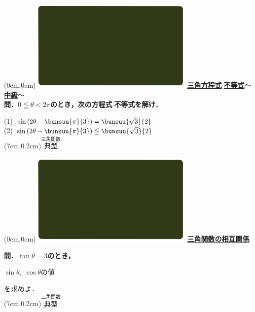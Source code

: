 \documentclass[10pt,
fleqn,
dvipdfmx,
uplatex
]{jsarticle}
\begin{document}
\newpage

\at(0cm,0cm){\includegraphics[width=8cm,bb=0 0 1920 1080]{./youtube/thumbnails/templates/smart_background/三角関数.jpeg}}
{\color{orange}\bf\boldmath\Large\underline{三角方程式$\cdot$不等式$〜$中級$〜$}}\vspace{0.3zw}\\
\small 
\bf\boldmath 問．$0\leqq \theta <2\pi$のとき，次の方程式$\cdot$不等式を解け．\vspace{0.5zw}

\Large 
(1)  $\sin \left(2\theta -\bunsuu{\pi }{3}\right)=\bunsuu{{\sqrt 3}}{2}$\\
(2)  $\sin \left(2\theta -\bunsuu{\pi }{3}\right)\leqq \bunsuu{{\sqrt 3}}{2}$\\

\at(7cm,0.2cm){\small\color{bradorange}$\overset{\text{三角関数}}{\text{典型}}$}

\newpage

\at(0cm,0cm){\includegraphics[width=8cm,bb=0 0 1920 1080]{./youtube/thumbnails/templates/smart_background/三角関数.jpeg}}
{\color{orange}\bf\boldmath\LARGE\underline{三角関数の相互関係}}\vspace{0.3zw}

\huge
\bf\boldmath 問．$\tan \theta =3$のとき，

\Huge
\hspace{0.2zw} $\sin \theta ,\;\cos \theta$の値 \hfill \hspace{0.2zw}

\huge
\hfill を求めよ．\\

\at(7cm,0.2cm){\small\color{bradorange}$\overset{\text{三角関数}}{\text{典型}}$}
\end{document}
